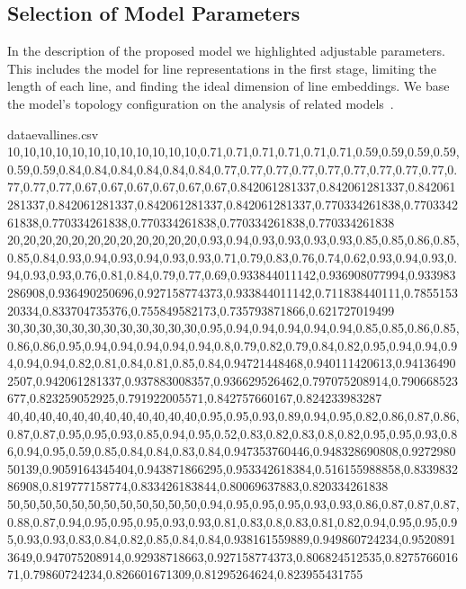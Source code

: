 \documentclass{llncs}
\begin{document}
\subsection{Selection of Model Parameters}
\label{sec:modelpar}
In the description of the proposed model we highlighted adjustable parameters.
This includes the model for line representations in the first stage, limiting the length of each line, and finding the ideal dimension of line embeddings.
We base the model's topology configuration on the analysis of related models~\cite{char_nn,lstm_cnn_crf,lstm_crf}.
\begin{filecontents*}{dataevallines.csv}
	10,10,10,10,10,10,10,10,10,10,10,10,0.71,0.71,0.71,0.71,0.71,0.71,0.59,0.59,0.59,0.59,0.59,0.59,0.84,0.84,0.84,0.84,0.84,0.84,0.77,0.77,0.77,0.77,0.77,0.77,0.77,0.77,0.77,0.77,0.77,0.77,0.67,0.67,0.67,0.67,0.67,0.67,0.842061281337,0.842061281337,0.842061281337,0.842061281337,0.842061281337,0.842061281337,0.770334261838,0.770334261838,0.770334261838,0.770334261838,0.770334261838,0.770334261838
	20,20,20,20,20,20,20,20,20,20,20,20,0.93,0.94,0.93,0.93,0.93,0.93,0.85,0.85,0.86,0.85,0.85,0.84,0.93,0.94,0.93,0.94,0.93,0.93,0.71,0.79,0.83,0.76,0.74,0.62,0.93,0.94,0.93,0.94,0.93,0.93,0.76,0.81,0.84,0.79,0.77,0.69,0.933844011142,0.936908077994,0.933983286908,0.936490250696,0.927158774373,0.933844011142,0.711838440111,0.785515320334,0.833704735376,0.755849582173,0.735793871866,0.621727019499
	30,30,30,30,30,30,30,30,30,30,30,30,0.95,0.94,0.94,0.94,0.94,0.94,0.85,0.85,0.86,0.85,0.86,0.86,0.95,0.94,0.94,0.94,0.94,0.94,0.8,0.79,0.82,0.79,0.84,0.82,0.95,0.94,0.94,0.94,0.94,0.94,0.82,0.81,0.84,0.81,0.85,0.84,0.94721448468,0.940111420613,0.941364902507,0.942061281337,0.937883008357,0.936629526462,0.797075208914,0.790668523677,0.823259052925,0.791922005571,0.842757660167,0.824233983287
	40,40,40,40,40,40,40,40,40,40,40,40,0.95,0.95,0.93,0.89,0.94,0.95,0.82,0.86,0.87,0.86,0.87,0.87,0.95,0.95,0.93,0.85,0.94,0.95,0.52,0.83,0.82,0.83,0.8,0.82,0.95,0.95,0.93,0.86,0.94,0.95,0.59,0.85,0.84,0.84,0.83,0.84,0.947353760446,0.948328690808,0.927298050139,0.9059164345404,0.943871866295,0.953342618384,0.516155988858,0.833983286908,0.819777158774,0.833426183844,0.80069637883,0.820334261838
	50,50,50,50,50,50,50,50,50,50,50,50,0.94,0.95,0.95,0.95,0.93,0.93,0.86,0.87,0.87,0.87,0.88,0.87,0.94,0.95,0.95,0.95,0.93,0.93,0.81,0.83,0.8,0.83,0.81,0.82,0.94,0.95,0.95,0.95,0.93,0.93,0.83,0.84,0.82,0.85,0.84,0.84,0.938161559889,0.949860724234,0.95208913649,0.947075208914,0.92938718663,0.927158774373,0.806824512535,0.827576601671,0.79860724234,0.826601671309,0.81295264624,0.823955431755

\end{filecontents*}
\end{document}
